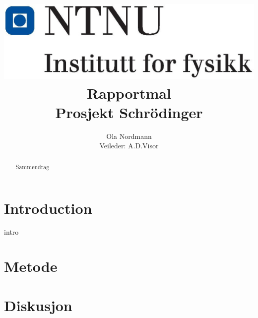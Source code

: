 \documentclass{article}
\title{
    \flushleft
    \includegraphics[width=.3\textwidth]{NTNU_logo.png}\\
    [1,5cm]
    \centering
    Rapportmal \\
    \small{Prosjekt Schrödinger}
}
\author{
    Ola Nordmann\\
    \small{Veileder: A.D.Visor}
    }
\begin{document}
    \maketitle
    \begin{abstract}
        Sammendrag
    \end{abstract}

    \section*{Introduction}
        intro \cite{kilde}

    \section*{Metode}
    \section*{Diskusjon}
    \printbibliography
\end{document}
